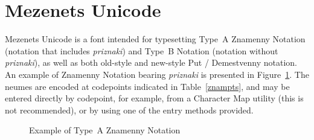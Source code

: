 \documentclass[11pt]{article}
\begin{document}
\section{Mezenets Unicode}

Mezenets Unicode is a font intended for typesetting Type~A Znamenny Notation (notation
that includes \emph{priznaki}) and Type~B Notation (notation without
\emph{priznaki}), as well as both old-style and new-style Put / Demestvenny notation.
An example of Znamenny Notation bearing \emph{priznaki} is presented in Figure~\ref{mezenets}. 
The neumes are encoded at codepoints indicated in Table~\ref{znampts},
and may be entered directly by codepoint, for example, from a Character Map
utility (this is not recommended), or by using one of the entry methods provided.

\begin{figure}[tbp]
\centering
\begin{minipage}{0.75\textwidth}
\begin{churchslavonic}
\noindent
{}
\end{churchslavonic}
\end{minipage}
\caption{Example of Type~A Znamenny Notation \label{mezenets}}
\end{figure}
\end{document}
